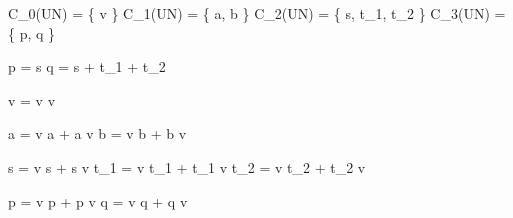 

C_{0}(UN) = \{ v \}
C_{1}(UN) = \{ a, b \}
C_{2}(UN) = \{ s, t_{1}, t_{2} \}
C_{3}(UN) = \{ p, q \}


\partial p = s
\partial q = s + t_{1} + t_{2}


\Delta v = v \otimes v

\Delta a = v \otimes a + a \otimes v
\Delta b = v \otimes b + b \otimes v

\Delta s = v \otimes s + s \otimes v
\Delta t_{1} = v \otimes t_{1} + t_{1} \otimes v
\Delta t_{2} = v \otimes t_{2} + t_{2} \otimes v

\Delta p = v \otimes p + p \otimes v
\Delta q = v \otimes q + q \otimes v